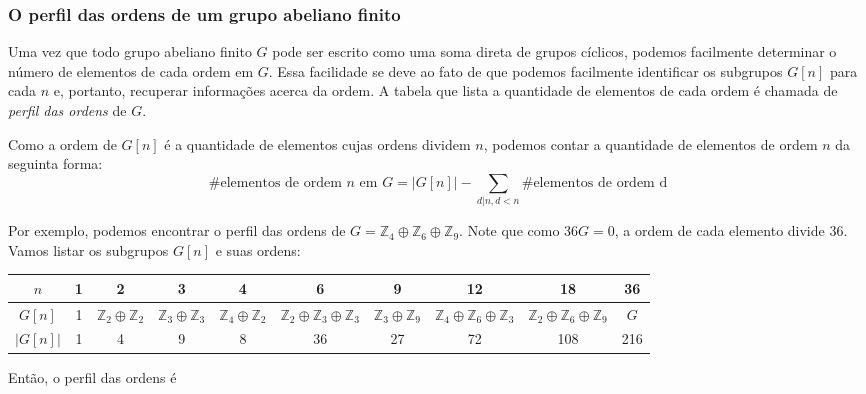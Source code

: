 	\subsubsection{O perfil das ordens de um grupo abeliano finito}
	\hspace{12pt} Uma vez que todo grupo abeliano finito $G$ pode ser escrito como uma soma direta de grupos cíclicos, podemos facilmente determinar o número de elementos de cada ordem em $G$. Essa facilidade se deve ao fato de que podemos facilmente identificar os subgrupos $G[n]$ para cada $n$ e, portanto, recuperar informações acerca da ordem. A tabela que lista a quantidade de elementos de cada ordem é chamada de \textit{perfil das ordens} de $G$.
	\par\vspace{0.3cm} Como a ordem de $G[n]$ é a quantidade de elementos cujas ordens dividem $n$, podemos contar a quantidade de elementos de ordem $n$ da seguinta forma:
	\begin{equation*}
	\#\text{elementos de ordem $n$ em $G$} = |G[n]| - \sum_{d|n, d<n}\#\text{elementos de ordem d}
	\end{equation*}
	\par\vspace{0.3cm} Por exemplo, podemos encontrar o perfil das ordens de $G = \mathbb{Z}_4\oplus\mathbb{Z}_6\oplus\mathbb{Z}_9$. Note que como $36G = 0$, a ordem de cada elemento divide $36$. Vamos listar os subgrupos $G[n]$ e suas ordens:
	\begin{center}
		\begin{tabular}{|c|c|c|c|c|c|c|c|c|c|}
		\hline
		$n$ & 1 & 2 & 3 & 4 & 6 & 9 & 12 & 18 & 36 \\
		\hline 
		$G[n]$ & 1 & $\mathbb{Z}_2\oplus\mathbb{Z}_2$ & $\mathbb{Z}_3\oplus\mathbb{Z}_3$ & $\mathbb{Z}_4\oplus\mathbb{Z}_2$ & $\mathbb{Z}_2\oplus\mathbb{Z}_3\oplus\mathbb{Z}_3$ & $\mathbb{Z}_3\oplus\mathbb{Z}_9$ & $\mathbb{Z}_4\oplus\mathbb{Z}_6\oplus\mathbb{Z}_3$ & $\mathbb{Z}_2\oplus\mathbb{Z}_6\oplus\mathbb{Z}_9$ & $G$ \\
		\hline 
		$|G[n]|$ & 1 & 4 & 9 & 8 & 36 & 27 & 72 & 108 & 216 \\
		\hline
		\end{tabular}
	\end{center}
	\par\vspace{0.3cm} Então, o perfil das ordens é
